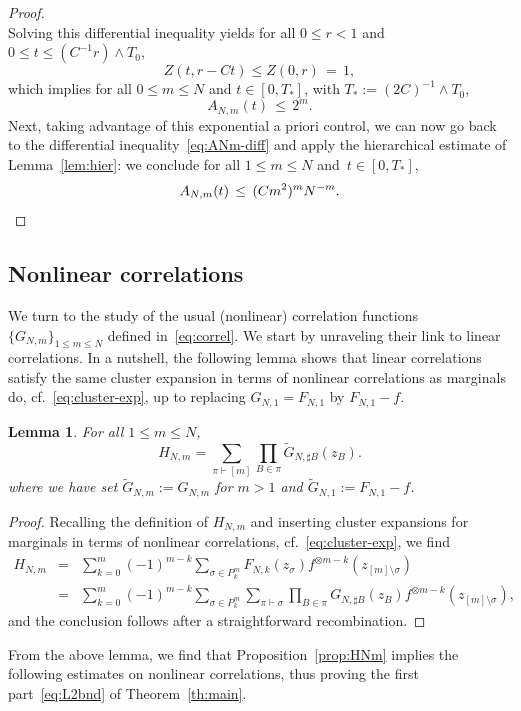\documentclass[a4paper,11pt,reqno,noindent]{amsart}
\theoremstyle{plain}
\newtheorem{lem}[theor]{Lemma}
\theoremstyle{definition}
\numberwithin{equation}{section}
\begin{document}
\begin{proof}
\begin{equation*}
\end{equation*}
Solving this differential inequality yields for all $0\le r<1$ and $0\le t\le (C^{-1}r)\wedge T_0$,
\begin{equation*}
Z(t,r-Ct)
\le Z(0,r)\,=\,1,
\end{equation*}
which implies for all $0\le m\le N$ and $t\in[0,T_*]$, with $T_*:=(2C)^{-1}\wedge T_0$,
\[A_{N,m}(t)\,\le\, 2^m.\]
Next, taking advantage of this exponential a priori control, we can now go back to the differential inequality~\eqref{eq:ANm-diff} and apply the hierarchical estimate of Lemma~\ref{lem:hier}: we conclude for all $1\le m\le N$ and~$t\in[0,T_*]$,
\[A_{N,m}(t)\,\le\, (Cm^2)^mN^{-m}.\qedhere\]
\end{proof}

\subsection{Nonlinear correlations}
We turn to the study of the usual (nonlinear) correlation functions $\{G_{N,m}\}_{1\le m\le N}$ defined in~\eqref{eq:correl}.
We start by unraveling their link to linear correlations. In a nutshell, the following lemma shows that linear correlations satisfy the same cluster expansion in terms of nonlinear correlations as marginals do, cf.~\eqref{eq:cluster-exp}, up to replacing $G_{N,1}=F_{N,1}$ by $F_{N,1}-f$.

\begin{lem}\label{lem:rel-G-H}
For all $1\le m\le N$,
\[H_{N,m}=\sum_{\pi\vdash[m]}\prod_{B\in\pi}\tilde G_{N,\sharp B}(z_B).\]
where we have set $\tilde G_{N,m}:=G_{N,m}$ for $m>1$ and $\tilde G_{N,1}:=F_{N,1}-f$.
\end{lem}

\begin{proof}
Recalling the definition of $H_{N,m}$ and inserting cluster expansions for marginals in terms of nonlinear correlations, cf.~\eqref{eq:cluster-exp}, we find
\begin{eqnarray*}
H_{N,m}&=&\sum_{k=0}^m(-1)^{m-k}\sum_{\sigma\in P^m_k}F_{N,k}(z_\sigma)f^{\otimes m-k}(z_{[m]\setminus\sigma})\\
&=&\sum_{k=0}^m(-1)^{m-k}\sum_{\sigma\in P^m_k}\sum_{\pi\vdash\sigma}\prod_{B\in\pi}G_{N,\sharp B}(z_B)f^{\otimes m-k}(z_{[m]\setminus\sigma}),
\end{eqnarray*}
and the conclusion follows after a straightforward recombination.
\end{proof}

From the above lemma, we find that Proposition~\ref{prop:HNm} implies the following estimates on nonlinear correlations, thus proving the first part~\eqref{eq:L2bnd} of Theorem~\ref{th:main}.
\end{document}
